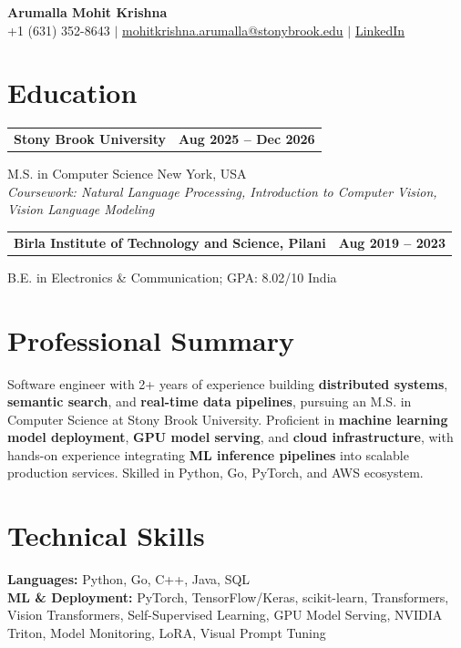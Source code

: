 \documentclass[letterpaper,10pt]{article}
\makeatletter
\newcommand{\entry}[2]{%
  \noindent
  \begin{tabularx}{\linewidth}
    {@{}>{\raggedright\arraybackslash}X@{\hspace{6pt}}r@{}}
    \textbf{#1} & #2
  \end{tabularx}\par
}
\makeatother
\begin{document}
\begin{center}
    {\LARGE\bfseries Arumalla Mohit Krishna}\\[3pt]
    +1 (631) 352-8643 $|$
    \href{mailto:mohitkrishna.arumalla@stonybrook.edu}
    {mohitkrishna.arumalla@stonybrook.edu} $|$
    \href{https://linkedin.com/in/mohit-krishna-arumalla}
    {LinkedIn}
\end{center}
\vspace{-8pt}

\section{Education}

\entry
  {Stony Brook University}
  {\textbf{Aug 2025 -- Dec 2026}}

M.S. in Computer Science \hfill New York, USA\\
\textit{
Coursework: Natural Language Processing,
Introduction to Computer Vision, Vision Language Modeling
}
\vspace{3pt}

\entry
  {Birla Institute of Technology and Science, Pilani}
  {\textbf{Aug 2019 -- 2023}}

B.E. in Electronics \& Communication; GPA: 8.02/10 \hfill India
\section{Professional Summary}

Software engineer with 2+ years of experience building \textbf{distributed systems}, \textbf{semantic search}, and \textbf{real-time data pipelines}, pursuing an M.S. in Computer Science at Stony Brook University. Proficient in \textbf{machine learning model deployment}, \textbf{GPU model serving}, and \textbf{cloud infrastructure}, with hands-on experience integrating \textbf{ML inference pipelines} into scalable production services. Skilled in Python, Go, PyTorch, and AWS ecosystem.
\section{Technical Skills}

\textbf{Languages:}
Python, Go, C++, Java, SQL\\

\textbf{ML \& Deployment:}
PyTorch, TensorFlow/Keras, scikit-learn, Transformers,
Vision Transformers, Self-Supervised Learning,
GPU Model Serving, NVIDIA Triton, Model Monitoring, LoRA, Visual Prompt Tuning\\
\end{document}
